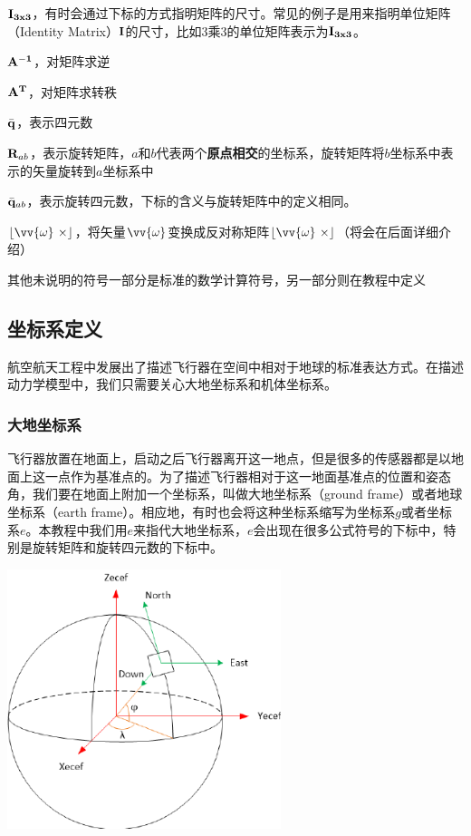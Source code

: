 \documentclass[11pt]{article}
\begin{document}
$\bf{I}_{3x3}$，有时会通过下标的方式指明矩阵的尺寸。常见的例子是用来指明单位矩阵（Identity Matrix）$\bf{I}$的尺寸，比如3乘3的单位矩阵表示为$\bf{I}_{3x3}$。

$\bf{A}^{-1}$，对矩阵求逆

$\bf{A}^T$，对矩阵求转秩

$\bar{\bf{q}}$，表示四元数

${\bf R}_{ab}$，表示旋转矩阵，$a$和$b$代表两个\textbf{原点相交}的坐标系，旋转矩阵将$b$坐标系中表示的矢量旋转到$a$坐标系中

$\bar{\bf{q}}_{ab}$，表示旋转四元数，下标的含义与旋转矩阵中的定义相同。

$\lfloor \vv{\omega} \ \times \rfloor$，将矢量$\vv{\omega}$变换成反对称矩阵$\lfloor \vv{\omega} \ \times \rfloor$（将会在后面详细介绍）

其他未说明的符号一部分是标准的数学计算符号，另一部分则在教程中定义
\subsection{坐标系定义}
航空航天工程中发展出了描述飞行器在空间中相对于地球的标准表达方式。在描述动力学模型中，我们只需要关心大地坐标系和机体坐标系。
\subsubsection{大地坐标系}
飞行器放置在地面上，启动之后飞行器离开这一地点，但是很多的传感器都是以地面上这一点作为基准点的。为了描述飞行器相对于这一地面基准点的位置和姿态角，我们要在地面上附加一个坐标系，叫做大地坐标系（ground frame）或者地球坐标系（earth frame）。相应地，有时也会将这种坐标系缩写为坐标系$g$或者坐标系$e$。本教程中我们用$e$来指代大地坐标系，$e$会出现在很多公式符号的下标中，特别是旋转矩阵和旋转四元数的下标中。

\begin{center}
\includegraphics[width=0.6\textwidth]{images/ned.png}
\end{center}
\end{document}
